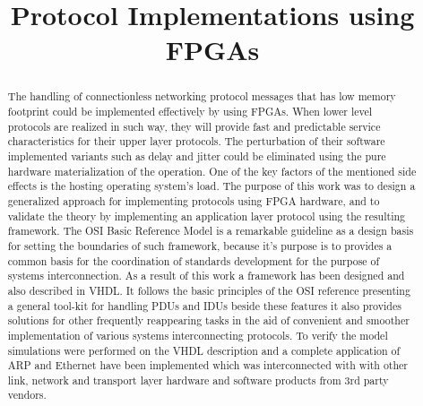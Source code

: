 \documentclass[conference]{IEEEtran}
\begin{document}
\title{Protocol Implementations using FPGAs}
\author{
}


\maketitle


\begin{abstract}
\boldmath
The handling of connectionless networking protocol messages that has low memory footprint could be implemented effectively by using FPGAs. When lower level protocols are realized in such way, they will provide fast and predictable service characteristics for their upper layer protocols. The perturbation of their software implemented variants such as delay and jitter could be eliminated using the pure hardware materialization of the operation. One of the key factors of the mentioned side effects is the hosting operating system’s load.
The purpose of this work was to design a generalized approach for implementing protocols using FPGA hardware, and to validate the theory by implementing an application layer protocol using the resulting framework.
The OSI Basic Reference Model is a remarkable guideline as a design basis for setting the boundaries of such framework, because it’s purpose is to provides a common basis for the coordination of standards development for the purpose of systems interconnection.
As a result of this work a framework has been designed and also described in VHDL. It follows the basic principles of the OSI reference presenting a general tool-kit for handling  PDUs and IDUs beside these features it also provides solutions for other frequently reappearing tasks in the aid of convenient and smoother implementation of various systems interconnecting protocols.
To verify the model simulations were performed on the VHDL description and a complete application of ARP and Ethernet have been implemented which was interconnected with with other link, network and transport layer hardware and software products from 3rd party vendors.
\end{abstract}
\end{document}
